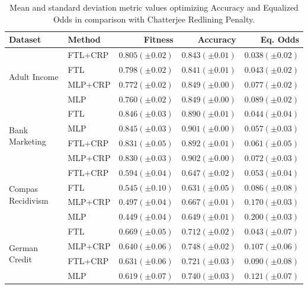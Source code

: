  \begin{table}
    \centering
    \caption{Mean and standard deviation metric values optimizing Accuracy and Equalized Odds in comparison with Chatterjee Redlining Penalty.}\label{tab:complete_acc_odds_crp}
    {\footnotesize \begin{tabular}{llrrr}
    \toprule
    Dataset & Method & Fitness & Accuracy & Eq. Odds \\
    \midrule
    
    \multirow[t]{4}{*}{Adult Income} & FTL+CRP & $0.805 (\pm0.02)$ & $0.843 (\pm0.01)$ & $0.038 (\pm0.02)$ \\
     & FTL & $0.798 (\pm0.02)$ & $0.841 (\pm0.01)$ & $0.043 (\pm0.02)$ \\
     & MLP+CRP & $0.772 (\pm0.02)$ & $0.849 (\pm0.00)$ & $0.077 (\pm0.02)$ \\
     & MLP & $0.760 (\pm0.02)$ & $0.849 (\pm0.00)$ & $0.089 (\pm0.02)$ \\
    \midrule
    \multirow[t]{4}{*}{Bank Marketing} & FTL & $0.846 (\pm0.03)$ & $0.890 (\pm0.01)$ & $0.044 (\pm0.04)$ \\
     & MLP & $0.845 (\pm0.03)$ & $0.901 (\pm0.00)$ & $0.057 (\pm0.03)$ \\
     & FTL+CRP & $0.831 (\pm0.05)$ & $0.892 (\pm0.01)$ & $0.061 (\pm0.05)$ \\
     & MLP+CRP & $0.830 (\pm0.03)$ & $0.902 (\pm0.00)$ & $0.072 (\pm0.03)$ \\
    \midrule
    \multirow[t]{4}{*}{Compas Recidivism} & FTL+CRP & $0.594 (\pm0.04)$ & $0.647 (\pm0.02)$ & $0.053 (\pm0.04)$ \\
     & FTL & $0.545 (\pm0.10)$ & $0.631 (\pm0.05)$ & $0.086 (\pm0.08)$ \\
     & MLP+CRP & $0.497 (\pm0.04)$ & $0.667 (\pm0.01)$ & $0.170 (\pm0.03)$ \\
     & MLP & $0.449 (\pm0.04)$ & $0.649 (\pm0.01)$ & $0.200 (\pm0.03)$ \\
    \midrule
    \multirow[t]{4}{*}{German Credit} & FTL & $0.669 (\pm0.05)$ & $0.712 (\pm0.02)$ & $0.043 (\pm0.07)$ \\
     & MLP+CRP & $0.640 (\pm0.06)$ & $0.748 (\pm0.02)$ & $0.107 (\pm0.06)$ \\
     & FTL+CRP & $0.631 (\pm0.06)$ & $0.721 (\pm0.03)$ & $0.090 (\pm0.08)$ \\
     & MLP & $0.619 (\pm0.07)$ & $0.740 (\pm0.03)$ & $0.121 (\pm0.07)$ \\
     \bottomrule
\end{tabular}}
\end{table}